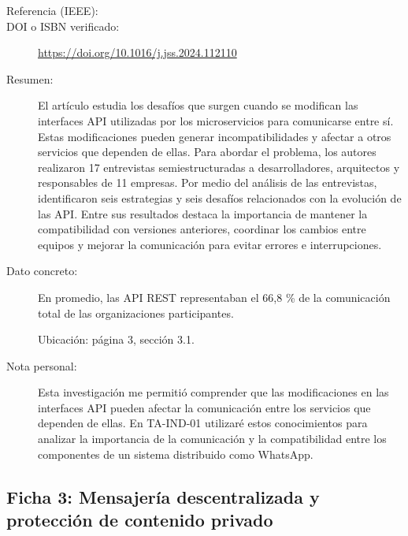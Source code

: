 \begin{description}

\item[Referencia (IEEE):]

\item[DOI o ISBN verificado:]
\url{https://doi.org/10.1016/j.jss.2024.112110}

\item[Resumen:]
El artículo estudia los desafíos que surgen cuando se modifican las interfaces API utilizadas por los microservicios para comunicarse entre sí. Estas modificaciones pueden generar incompatibilidades y afectar a otros servicios que dependen de ellas. Para abordar el problema, los autores realizaron 17 entrevistas semiestructuradas a desarrolladores, arquitectos y responsables de 11 empresas. Por medio del análisis de las entrevistas, identificaron seis estrategias y seis desafíos relacionados con la evolución de las API. Entre sus resultados destaca la importancia de mantener la compatibilidad con versiones anteriores, coordinar los cambios entre equipos y mejorar la comunicación para evitar errores e interrupciones.

\item[Dato concreto:]
En promedio, las API REST representaban el 66,8 \% de la comunicación total de las organizaciones participantes.

Ubicación: página 3, sección 3.1.

\item[Nota personal:]
Esta investigación me permitió comprender que las modificaciones en las interfaces API pueden afectar la comunicación entre los servicios que dependen de ellas. En TA-IND-01 utilizaré estos conocimientos para analizar la importancia de la comunicación y la compatibilidad entre los componentes de un sistema distribuido como WhatsApp.

\end{description}



\subsection{Ficha 3: Mensajería descentralizada y protección de contenido privado}

